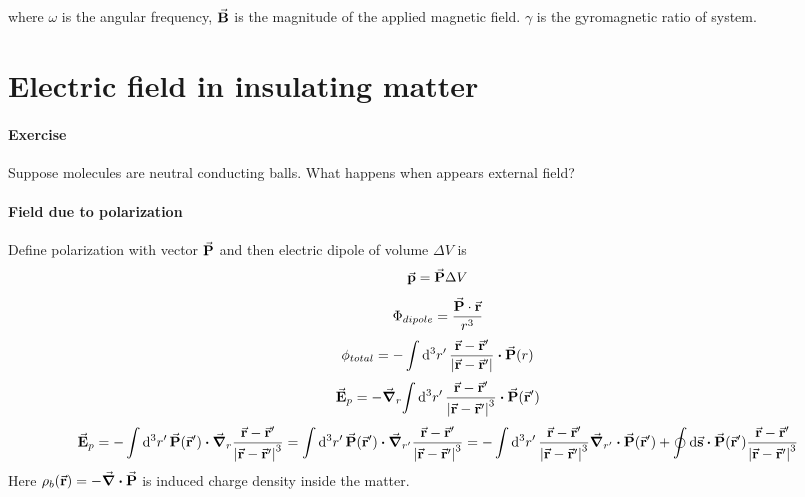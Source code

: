where $\omega $ is the angular frequency, $\va{B}$ is the magnitude of the applied magnetic field. $\gamma$ is the gyromagnetic ratio of system.

\section{Electric field in insulating matter}
\paragraph{Exercise}
Suppose molecules are neutral conducting balls. What happens when appears external field? 
\paragraph{Field due to polarization}
Define polarization with vector $\va{P}$ and then electric dipole of volume $\Delta V$ is
$$\va{p} = \va{P} \Delta V $$ %
$$\Phi_{dipole} = \frac{\va{P}\cdot \va{r}}{r^3}$$
$$\phi_{total} =- \int \dd[3]{r'} \frac{\va{r} - \va{r}'}{\abs{\va{r} -\va{r}'}}\vdot \va{P}(r) $$
$$ \va{E}_p = -\grad_r{\int \dd[3]{r'} \frac{\va{r}-\va{r}'}{\abs{\va{r}-\va{r}'}^3} \vdot \va{P}(\va{r}')}$$
$$\va{E}_p = -\int \dd[3]{r'}  \va{P}(\va{r}') \vdot \grad_r\frac{\va{r}-\va{r}'}{\abs{\va{r}-\va{r}'}^3}  = \int \dd[3]{r'}  \va{P}(\va{r}') \vdot \grad_{r'}\frac{\va{r}-\va{r}'}{\abs{\va{r}-\va{r}'}^3} = -\int \dd[3]{r'}  \frac{\va{r}-\va{r}'}{\abs{\va{r}-\va{r}'}^3}  \grad_{r'} \vdot \va{P}(\va{r}') + \oint \dd{\va{s}}  \vdot \va{P} (\va{r}') \frac{\va{r}-\va{r}'}{\abs{\va{r}-\va{r}'}^3}  $$
Here $\rho_b(\va{r}) = -\div{\va{P}}$ is induced charge density inside the matter.